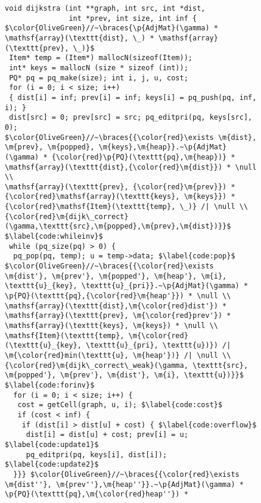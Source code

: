
\begin{figure}[t]

\begin{lstlisting}[mathescape=true,showlines=true]
void dijkstra (int **graph, int src, int *dist, 
               int *prev, int size, int inf {
$\color{OliveGreen}//~\braces{\p{AdjMat}(\gamma) *
\mathsf{array}(\texttt{dist}, \_) * \mathsf{array}(\texttt{prev}, \_)}$
 Item* temp = (Item*) mallocN(sizeof(Item));
 int* keys = mallocN (size * sizeof (int));
 PQ* pq = pq_make(size); int i, j, u, cost;
 for (i = 0; i < size; i++) 
 { dist[i] = inf; prev[i] = inf; keys[i] = pq_push(pq, inf, i); }
 dist[src] = 0; prev[src] = src; pq_editpri(pq, keys[src], 0);
$\color{OliveGreen}//~\braces{{\color{red}\exists \m{dist}, \m{prev}, \m{popped}, \m{keys},\m{heap}}.~\p{AdjMat}(\gamma) * {\color{red}\p{PQ}(\texttt{pq},\m{heap})} * \mathsf{array}(\texttt{dist},{\color{red}\m{dist}}) * \null \\
\mathsf{array}(\texttt{prev}, {\color{red}\m{prev}}) * 
{\color{red}\mathsf{array}(\texttt{keys}, \m{keys}}) * 
{\color{red}\mathsf{Item}(\texttt{temp}, \_)} /| \null \\
{\color{red}\m{dijk\_correct}(\gamma,\texttt{src},\m{popped},\m{prev},\m{dist})}}$ $\label{code:whileinv}$
 while (pq_size(pq) > 0) {
  pq_pop(pq, temp); u = temp->data; $\label{code:pop}$
$\color{OliveGreen}//~\braces{{\color{red}\exists \m{dist'}, \m{prev'}, \m{popped'}, \m{heap'}, \m{i}, \texttt{u}_{key}, \texttt{u}_{pri}}.~\p{AdjMat}(\gamma) * \p{PQ}(\texttt{pq},{\color{red}\m{heap'}}) * \null \\
\mathsf{array}(\texttt{dist},\m{\color{red}dist'}) * 
\mathsf{array}(\texttt{prev}, \m{\color{red}prev'}) * 
\mathsf{array}(\texttt{keys}, \m{keys}) * \null \\
\mathsf{Item}(\texttt{temp}, \m{\color{red}(\texttt{u}_{key}, \texttt{u}_{pri}, \texttt{u})}) /| 
\m{\color{red}min(\texttt{u}, \m{heap'})} /| \null \\
{\color{red}\m{dijk\_correct\_weak}(\gamma, \texttt{src}, \m{popped'}, \m{prev'}, \m{dist'}, \m{i}, \texttt{u})}}$ $\label{code:forinv}$
  for (i = 0; i < size; i++) {
   cost = getCell(graph, u, i); $\label{code:cost}$
   if (cost < inf) {
    if (dist[i] > dist[u] + cost) { $\label{code:overflow}$
     dist[i] = dist[u] + cost; prev[i] = u; $\label{code:update1}$ 
     pq_editpri(pq, keys[i], dist[i]); $\label{code:update2}$
  }}} $\color{OliveGreen}//~\braces{{\color{red}\exists \m{dist''}, \m{prev''},\m{heap''}}.~\p{AdjMat}(\gamma) * \p{PQ}(\texttt{pq},\m{\color{red}heap''}) *

\end{lstlisting}
\end{figure}
